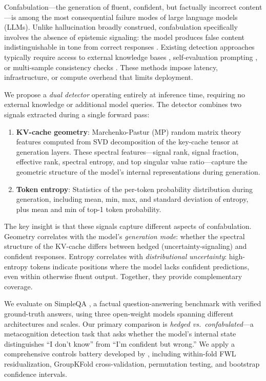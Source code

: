 \documentclass[11pt,a4paper]{article}
\begin{document}
Confabulation---the generation of fluent, confident, but factually incorrect content---is among the most consequential failure modes of large language models (LLMs). Unlike hallucination broadly construed, confabulation specifically involves the absence of epistemic signaling: the model produces false content indistinguishable in tone from correct responses \citep{ji2023survey}. Existing detection approaches typically require access to external knowledge bases \citep{min2023factscore}, self-evaluation prompting \citep{kadavath2022language}, or multi-sample consistency checks \citep{manakul2023selfcheckgpt}. These methods impose latency, infrastructure, or compute overhead that limits deployment.

We propose a \emph{dual detector} operating entirely at inference time, requiring no external knowledge or additional model queries. The detector combines two signals extracted during a single forward pass:

\begin{enumerate}[nosep]
    \item \textbf{KV-cache geometry}: Marchenko-Pastur (MP) random matrix theory features computed from SVD decomposition of the key-cache tensor at generation layers. These spectral features---signal rank, signal fraction, effective rank, spectral entropy, and top singular value ratio---capture the geometric structure of the model's internal representations during generation.
    \item \textbf{Token entropy}: Statistics of the per-token probability distribution during generation, including mean, min, max, and standard deviation of entropy, plus mean and min of top-1 token probability.
\end{enumerate}

The key insight is that these signals capture different aspects of confabulation. Geometry correlates with the model's \emph{generation mode}: whether the spectral structure of the KV-cache differs between hedged (uncertainty-signaling) and confident responses. Entropy correlates with \emph{distributional uncertainty}: high-entropy tokens indicate positions where the model lacks confident predictions, even within otherwise fluent output. Together, they provide complementary coverage.

We evaluate on SimpleQA \citep{wei2024simpleqa}, a factual question-answering benchmark with verified ground-truth answers, using three open-weight models spanning different architectures and scales. Our primary comparison is \emph{hedged vs.\ confabulated}---a metacognition detection task that asks whether the model's internal state distinguishes ``I don't know'' from ``I'm confident but wrong.'' We apply a comprehensive controls battery developed by \citet{wilkes2026kv}, including within-fold FWL residualization, GroupKFold cross-validation, permutation testing, and bootstrap confidence intervals.
\end{document}
